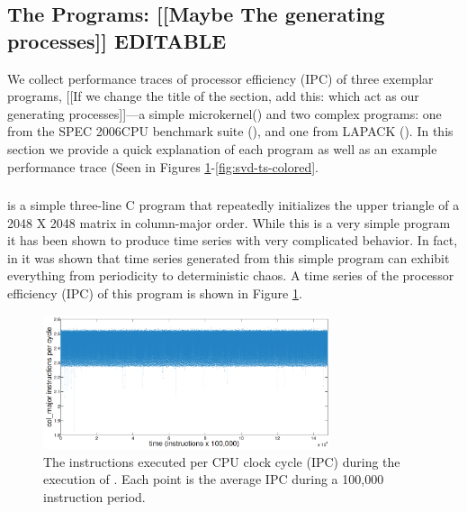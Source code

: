 \subsection{The Programs: [[Maybe The generating processes]]{\color{blue} EDITABLE}}
We collect performance traces of processor efficiency (IPC) of three exemplar programs, [[If we change the title of the section, add this: which act as our generating processes]]---a simple microkernel(\col) and two complex programs: one from the
SPEC 2006CPU benchmark suite (\gcc), and one from LAPACK (\svd). In this section we provide a quick explanation of each program as well as an example performance trace (Seen in Figures \ref{fig:col-ts}-\ref{fig:svd-ts-colored}.
\subsubsection{}
\col is a simple three-line C program that repeatedly initializes the upper triangle of a  2048 X 2048 matrix in column-major order. While this is a very simple program it has been shown to produce time series with very complicated behavior. In fact, in \cite{mytkowicz09} it was shown that time series generated from this simple program can exhibit everything from periodicity to deterministic chaos.  A time series of the processor efficiency (IPC) of this program is shown in Figure \ref{fig:col-ts}.

\begin{figure}[htbp]
  \centering
    \includegraphics[width=0.75\textwidth]{figs/colFullTS}
    \caption{The instructions executed per CPU clock cycle (IPC) during the execution of \col. Each point is the average IPC during a 100,000 instruction period.}
    \label{fig:col-ts}
  
  \end{figure}

\subsubsection{}

